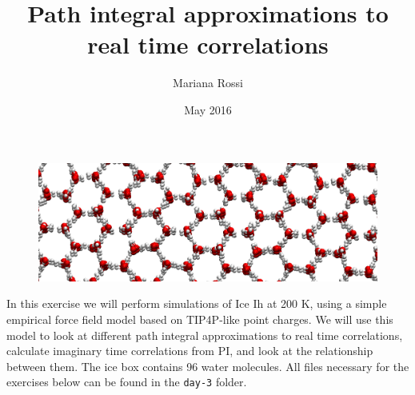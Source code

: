 \documentclass{article}
\title{Path integral approximations to real time correlations}
\author{Mariana Rossi}
\date{May 2016}
\begin{document}
\maketitle

\begin{figure}[ht]
\centering
\includegraphics[width=\textwidth]{ice.png}
\end{figure}

In this exercise we will perform
simulations of Ice Ih at 200 K,
using a simple empirical force field model based
on TIP4P-like point charges. We will use this model to look
at different path integral approximations to real time correlations, calculate imaginary
time correlations from PI, and look at the relationship between them. The ice box contains 96 water molecules.
All files necessary for the exercises below can be found in the \texttt{day-3} folder.




\end{document}
